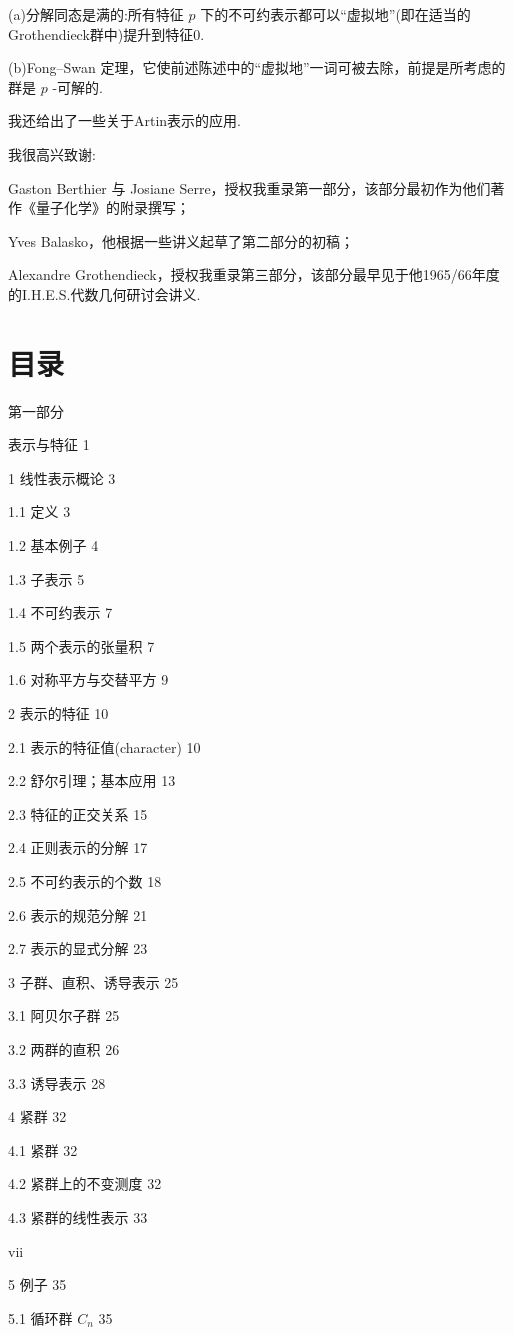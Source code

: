 \documentclass[10pt]{article}
\begin{document}
(a)分解同态是满的:所有特征 \(p\) 下的不可约表示都可以“虚拟地”(即在适当的Grothendieck群中)提升到特征0.

(b)Fong–Swan 定理，它使前述陈述中的“虚拟地”一词可被去除，前提是所考虑的群是 \(p\) -可解的.

我还给出了一些关于Artin表示的应用.

我很高兴致谢:

Gaston Berthier 与 Josiane Serre，授权我重录第一部分，该部分最初作为他们著作《量子化学》的附录撰写；

Yves Balasko，他根据一些讲义起草了第二部分的初稿；

Alexandre Grothendieck，授权我重录第三部分，该部分最早见于他1965/66年度的I.H.E.S.代数几何研讨会讲义.

\section*{目录}

第一部分

表示与特征 1

1 线性表示概论 3

1.1 定义 3

1.2 基本例子 4

1.3 子表示 5

1.4 不可约表示 7

1.5 两个表示的张量积 7

1.6 对称平方与交替平方 9

2 表示的特征 10

2.1 表示的特征值(character) 10

2.2 舒尔引理；基本应用 13

2.3 特征的正交关系 15

2.4 正则表示的分解 17

2.5 不可约表示的个数 18

2.6 表示的规范分解 21

2.7 表示的显式分解 23

3 子群、直积、诱导表示 25

3.1 阿贝尔子群 25

3.2 两群的直积 26

3.3 诱导表示 28

4 紧群 32

4.1 紧群 32

4.2 紧群上的不变测度 32

4.3 紧群的线性表示 33

vii

5 例子 35

5.1 循环群 \({C}_{n}\) 35
\end{document}
